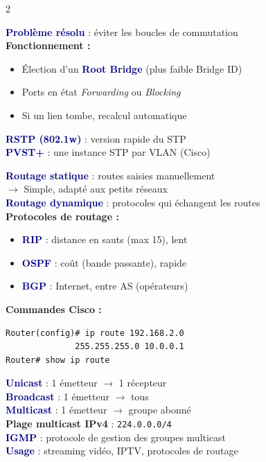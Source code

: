 \documentclass[a4paper,10pt]{article}
\newcommand{\key}[1]{\textbf{\textcolor{navy}{#1}}}
\begin{document}
\begin{multicols}{2}
\begin{tcolorbox}[basebox, colframe=crimson, title=9. Spanning Tree Protocol (STP)]
\key{Problème résolu} : éviter les boucles de commutation \\[3pt]
\textbf{Fonctionnement :}
\begin{itemize}
  \item Élection d'un \key{Root Bridge} (plus faible Bridge ID)
  \item Ports en état \textit{Forwarding} ou \textit{Blocking}
  \item Si un lien tombe, recalcul automatique
\end{itemize}
\vspace{3pt}
\key{RSTP (802.1w)} : version rapide du STP \\
\key{PVST+} : une instance STP par VLAN (Cisco)
\end{tcolorbox}

\begin{tcolorbox}[basebox, colframe=green, title=10. Routage — Concepts]
\key{Routage statique} : routes saisies manuellement \\
\quad $\to$ Simple, adapté aux petits réseaux \\
\key{Routage dynamique} : protocoles qui échangent les routes \\[3pt]
\textbf{Protocoles de routage :}
\begin{itemize}
  \item \key{RIP} : distance en sauts (max 15), lent
  \item \key{OSPF} : coût (bande passante), rapide
  \item \key{BGP} : Internet, entre AS (opérateurs)
\end{itemize}
\vspace{3pt}
\textbf{Commandes Cisco :}
\begin{verbatim}
Router(config)# ip route 192.168.2.0
              255.255.255.0 10.0.0.1
Router# show ip route
\end{verbatim}
\end{tcolorbox}

\begin{tcolorbox}[basebox, colframe=navy, title=11. Multicast]
\key{Unicast} : 1 émetteur $\to$ 1 récepteur \\
\key{Broadcast} : 1 émetteur $\to$ tous \\
\key{Multicast} : 1 émetteur $\to$ groupe abonné \\[3pt]
\textbf{Plage multicast IPv4} : \texttt{224.0.0.0/4} \\
\key{IGMP} : protocole de gestion des groupes multicast \\
\key{Usage} : streaming vidéo, IPTV, protocoles de routage
\end{tcolorbox}


\end{multicols}
\end{document}
